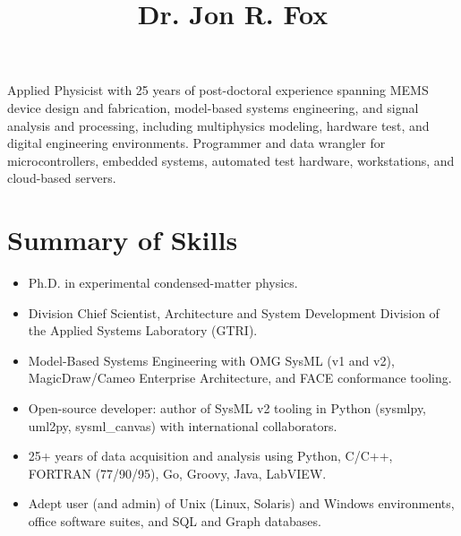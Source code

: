 \documentclass[american]{cv}
\begin{document}



\title{Dr. Jon R. Fox}

\maketitle
Applied Physicist with 25 years of post-doctoral experience spanning MEMS
device design and fabrication, model-based systems engineering, and signal
analysis and processing, including multiphysics modeling, hardware test, and
digital engineering environments. Programmer and data wrangler for
microcontrollers, embedded systems, automated test hardware, workstations,
and cloud-based servers.

\section{Summary of Skills}

\begin{itemize}

    \item Ph.D. in experimental condensed-matter physics.
    \item Division Chief Scientist, Architecture and System Development
        Division of the Applied Systems Laboratory (GTRI).
    \item Model-Based Systems Engineering with OMG SysML (v1 and v2),
        MagicDraw/Cameo Enterprise Architecture, and FACE conformance tooling.
    \item Open-source developer: author of SysML v2 tooling in Python
        (sysmlpy, uml2py, sysml\_canvas) with international collaborators.
    \item 25+ years of data acquisition and analysis using Python, C/C++,
        FORTRAN (77/90/95), Go, Groovy, Java, LabVIEW.
    \item Adept user (and admin) of Unix (Linux, Solaris) and Windows
        environments, office software suites, and SQL and Graph databases.

\end{itemize}
\end{document}
